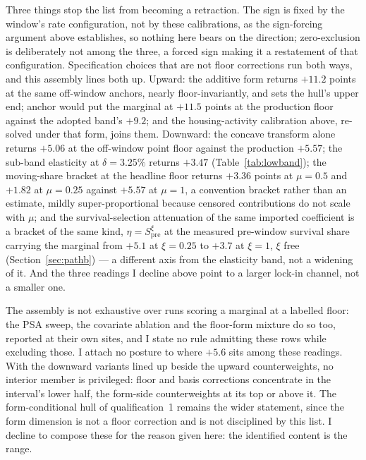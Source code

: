 Three things stop the list from becoming a retraction. The sign is fixed by the window's rate configuration, not by these calibrations, as the sign-forcing argument above establishes, so nothing here bears on the direction; zero-exclusion is deliberately not among the three, a forced sign making it a restatement of that configuration. Specification choices that are not floor corrections run both ways, and this assembly lines both up. Upward: the additive form returns $+11.2$ points at the same off-window anchors, nearly floor-invariantly, and sets the hull's upper end;  anchor would put the marginal at $+11.5$ points at the production floor against the adopted band's $+9.2$; and the housing-activity calibration above, re-solved under that form, joins them. Downward: the concave transform alone returns $+5.06$ at the off-window point floor against the production $+5.57$; the sub-band elasticity at $\delta = 3.25\%$ returns $+3.47$ (Table~\ref{tab:lowband}); the moving-share bracket at the headline floor returns $+3.36$ points at $\mu = 0.5$ and $+1.82$ at $\mu = 0.25$ against $+5.57$ at $\mu = 1$, a convention bracket rather than an estimate, mildly super-proportional because censored contributions do not scale with $\mu$; and the survival-selection attenuation of the same imported coefficient is a bracket of the same kind, $\eta = S_{\mathrm{pre}}^{\xi}$ at the measured pre-window survival share carrying the marginal from $+5.1$ at $\xi = 0.25$ to $+3.7$ at $\xi = 1$, $\xi$ free (Section~\ref{sec:pathb}) --- a different axis from the elasticity band, not a widening of it. And the three readings I decline above point to a larger lock-in channel, not a smaller one.

The assembly is not exhaustive over runs scoring a marginal at a labelled floor: the PSA sweep, the covariate ablation and the floor-form mixture do so too, reported at their own sites, and I state no rule admitting these rows while excluding those. I attach no posture to where $+5.6$ sits among these readings. With the downward variants lined up beside the upward counterweights, no interior member is privileged: floor and basis corrections concentrate in the interval's lower half, the form-side counterweights at its top or above it. The form-conditional hull of qualification~1 remains the wider statement, since the form dimension is not a floor correction and is not disciplined by this list. I decline to compose these for the reason given here: the identified content is the range.

